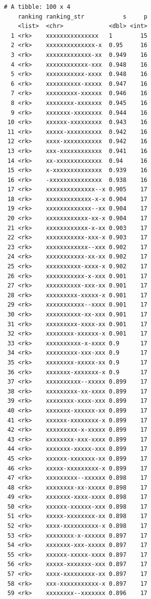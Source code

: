 \documentclass[
  letterpaper,
  DIV=11,
  numbers=noendperiod]{scrreprt}
\begin{document}
\begin{verbatim}
# A tibble: 100 x 4
    ranking ranking_str           s     p
    <list>  <chr>             <dbl> <int>
  1 <rk>    xxxxxxxxxxxxxxx   1        15
  2 <rk>    xxxxxxxxxxxxxx-x  0.95     16
  3 <rk>    xxxxxxxxxxxxx-xx  0.949    16
  4 <rk>    xxxxxxxxxxxx-xxx  0.948    16
  5 <rk>    xxxxxxxxxxx-xxxx  0.948    16
  6 <rk>    xxxxxxxxxx-xxxxx  0.947    16
  7 <rk>    xxxxxxxxx-xxxxxx  0.946    16
  8 <rk>    xxxxxxxx-xxxxxxx  0.945    16
  9 <rk>    xxxxxxx-xxxxxxxx  0.944    16
 10 <rk>    xxxxxx-xxxxxxxxx  0.943    16
 11 <rk>    xxxxx-xxxxxxxxxx  0.942    16
 12 <rk>    xxxx-xxxxxxxxxxx  0.942    16
 13 <rk>    xxx-xxxxxxxxxxxx  0.941    16
 14 <rk>    xx-xxxxxxxxxxxxx  0.94     16
 15 <rk>    x-xxxxxxxxxxxxxx  0.939    16
 16 <rk>    -xxxxxxxxxxxxxxx  0.938    16
 17 <rk>    xxxxxxxxxxxxxx--x 0.905    17
 18 <rk>    xxxxxxxxxxxxx-x-x 0.904    17
 19 <rk>    xxxxxxxxxxxxx--xx 0.904    17
 20 <rk>    xxxxxxxxxxxx-xx-x 0.904    17
 21 <rk>    xxxxxxxxxxxx-x-xx 0.903    17
 22 <rk>    xxxxxxxxxxx-xxx-x 0.903    17
 23 <rk>    xxxxxxxxxxxx--xxx 0.902    17
 24 <rk>    xxxxxxxxxxx-xx-xx 0.902    17
 25 <rk>    xxxxxxxxxx-xxxx-x 0.902    17
 26 <rk>    xxxxxxxxxxx-x-xxx 0.901    17
 27 <rk>    xxxxxxxxxx-xxx-xx 0.901    17
 28 <rk>    xxxxxxxxx-xxxxx-x 0.901    17
 29 <rk>    xxxxxxxxxxx--xxxx 0.901    17
 30 <rk>    xxxxxxxxxx-xx-xxx 0.901    17
 31 <rk>    xxxxxxxxx-xxxx-xx 0.901    17
 32 <rk>    xxxxxxxx-xxxxxx-x 0.901    17
 33 <rk>    xxxxxxxxxx-x-xxxx 0.9      17
 34 <rk>    xxxxxxxxx-xxx-xxx 0.9      17
 35 <rk>    xxxxxxxx-xxxxx-xx 0.9      17
 36 <rk>    xxxxxxx-xxxxxxx-x 0.9      17
 37 <rk>    xxxxxxxxxx--xxxxx 0.899    17
 38 <rk>    xxxxxxxxx-xx-xxxx 0.899    17
 39 <rk>    xxxxxxxx-xxxx-xxx 0.899    17
 40 <rk>    xxxxxxx-xxxxxx-xx 0.899    17
 41 <rk>    xxxxxx-xxxxxxxx-x 0.899    17
 42 <rk>    xxxxxxxxx-x-xxxxx 0.899    17
 43 <rk>    xxxxxxxx-xxx-xxxx 0.899    17
 44 <rk>    xxxxxxx-xxxxx-xxx 0.899    17
 45 <rk>    xxxxxx-xxxxxxx-xx 0.899    17
 46 <rk>    xxxxx-xxxxxxxxx-x 0.899    17
 47 <rk>    xxxxxxxxx--xxxxxx 0.898    17
 48 <rk>    xxxxxxxx-xx-xxxxx 0.898    17
 49 <rk>    xxxxxxx-xxxx-xxxx 0.898    17
 50 <rk>    xxxxxx-xxxxxx-xxx 0.898    17
 51 <rk>    xxxxx-xxxxxxxx-xx 0.898    17
 52 <rk>    xxxx-xxxxxxxxxx-x 0.898    17
 53 <rk>    xxxxxxxx-x-xxxxxx 0.897    17
 54 <rk>    xxxxxxx-xxx-xxxxx 0.897    17
 55 <rk>    xxxxxx-xxxxx-xxxx 0.897    17
 56 <rk>    xxxxx-xxxxxxx-xxx 0.897    17
 57 <rk>    xxxx-xxxxxxxxx-xx 0.897    17
 58 <rk>    xxx-xxxxxxxxxxx-x 0.897    17
 59 <rk>    xxxxxxxx--xxxxxxx 0.896    17

\end{verbatim}
\end{document}
